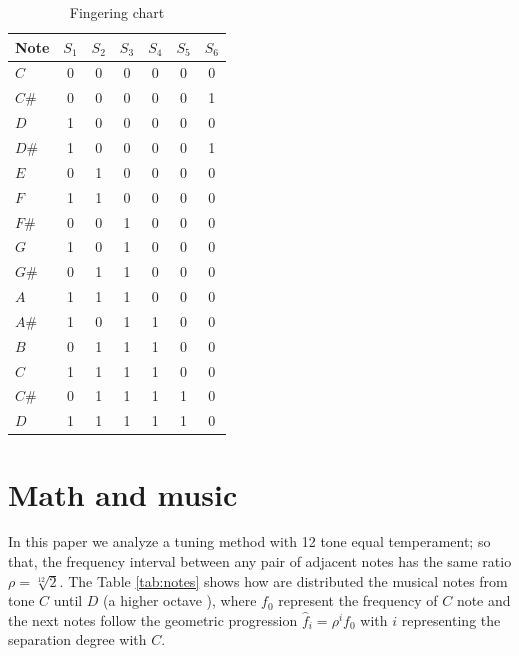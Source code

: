 \documentclass[11pt,twocolumn]{article}
\begin{document}
\begin{table}[h!]
\center
\begin{tabular}{l|c|c|c|c|c|c}
Note & $S_1$ & $S_2$ & $S_3$ & $S_4$ & $S_5$ & $S_6$ \\ \hline
\hline 
$C$  & 0 & 0 & 0 & 0 & 0 & 0 \\
$C\#$& 0 & 0 & 0 & 0 & 0 & 1 \\
$D$  & 1 & 0 & 0 & 0 & 0 & 0 \\
$D\#$& 1 & 0 & 0 & 0 & 0 & 1 \\
$E$  & 0 & 1 & 0 & 0 & 0 & 0 \\
$F$  & 1 & 1 & 0 & 0 & 0 & 0 \\
$F\#$& 0 & 0 & 1 & 0 & 0 & 0 \\
$G$  & 1 & 0 & 1 & 0 & 0 & 0 \\
$G\#$& 0 & 1 & 1 & 0 & 0 & 0 \\
$A$  & 1 & 1 & 1 & 0 & 0 & 0 \\
$A\#$& 1 & 0 & 1 & 1 & 0 & 0 \\
$B$  & 0 & 1 & 1 & 1 & 0 & 0 \\
$C$& 1 & 1 & 1 & 1 & 0 & 0 \\
$C\#$& 0 & 1 & 1 & 1 & 1 & 0 \\
$D$& 1 & 1 & 1 & 1 & 1 & 0 \\ 
\hline 
\end{tabular}
\vspace{5pt}
\caption{Fingering chart}
\label{table:chart}
\end{table}

\section{Math and music}
In this paper we analyze a tuning method with 12 tone equal temperament; so that, the frequency interval
between any pair of adjacent notes has the same ratio $\rho = {\sqrt[12]{2}}$.
The Table \ref{tab:notes} shows how are distributed the musical notes from tone $C$ until $D$ (a higher octave ),
where $f_0$ represent the frequency of $C$ note and the next notes
follow the geometric progression $\hat{f}_{i}={\rho}^i f_{0}$ with $i$ representing the separation degree with $C$. 
\end{document}
